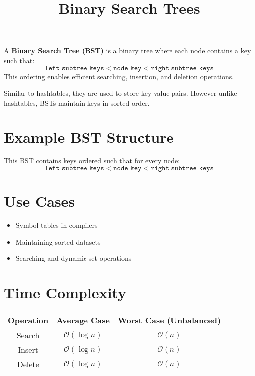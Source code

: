 \documentclass{article}
\title{Binary Search Trees}
\author{}
\date{}
\begin{document}
\maketitle

A \textbf{Binary Search Tree (BST)} is a binary tree where each node contains a key such that:
\[
\texttt{left subtree keys} < \texttt{node key} < \texttt{right subtree keys}
\]
This ordering enables efficient searching, insertion, and deletion operations.

Similar to hashtables, they are used to store key-value pairs. However unlike hashtables, BSTs maintain keys in sorted order.


\section{Example BST Structure}

\begin{center}
\end{center}

This BST contains keys ordered such that for every node:
\[
\texttt{left subtree keys} < \texttt{node key} < \texttt{right subtree keys}
\]

\section{Use Cases}
\begin{itemize}
  \item Symbol tables in compilers
  \item Maintaining sorted datasets
  \item Searching and dynamic set operations
\end{itemize}

\section{Time Complexity}

\begin{tabular}{|c|c|c|}
\hline
\textbf{Operation} & \textbf{Average Case} & \textbf{Worst Case (Unbalanced)} \\
\hline
Search & $\mathcal{O}(\log n)$ & $\mathcal{O}(n)$ \\
Insert & $\mathcal{O}(\log n)$ & $\mathcal{O}(n)$ \\
Delete & $\mathcal{O}(\log n)$ & $\mathcal{O}(n)$ \\
\hline
\end{tabular}
\end{document}
